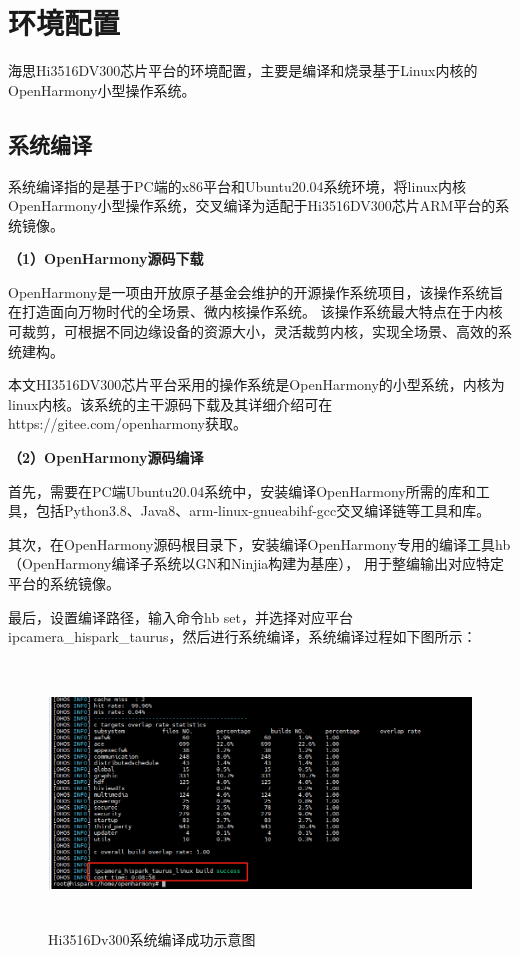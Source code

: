 \section{环境配置}
海思Hi3516DV300芯片平台的环境配置，主要是编译和烧录基于Linux内核的OpenHarmony小型操作系统。

\subsection{系统编译}
系统编译指的是基于PC端的x86平台和Ubuntu20.04系统环境，将linux内核OpenHarmony小型操作系统，交叉编译为适配于Hi3516DV300芯片ARM平台的系统镜像。

\textbf{（1）OpenHarmony源码下载}

OpenHarmony是一项由开放原子基金会维护的开源操作系统项目，该操作系统旨在打造面向万物时代的全场景、微内核操作系统。
该操作系统最大特点在于内核可裁剪，可根据不同边缘设备的资源大小，灵活裁剪内核，实现全场景、高效的系统建构。

本文HI3516DV300芯片平台采用的操作系统是OpenHarmony的小型系统，内核为linux内核。该系统的主干源码下载及其详细介绍可在https://gitee.com/openharmony获取。

\textbf{（2）OpenHarmony源码编译}

首先，需要在PC端Ubuntu20.04系统中，安装编译OpenHarmony所需的库和工具，包括Python3.8、Java8、arm-linux-gnueabihf-gcc交叉编译链等工具和库。

其次，在OpenHarmony源码根目录下，安装编译OpenHarmony专用的编译工具hb（OpenHarmony编译子系统以GN和Ninjia构建为基座），
用于整编输出对应特定平台的系统镜像。

最后，设置编译路径，输入命令hb set，并选择对应平台ipcamera\_hispark\_taurus，然后进行系统编译，系统编译过程如下图所示：
\begin{figure}[H]
    \includegraphics[width=12cm, height=7cm]{pic/build-taurus.png}
    \caption{Hi3516Dv300系统编译成功示意图}
    \label{build-taurus}
\end{figure}

